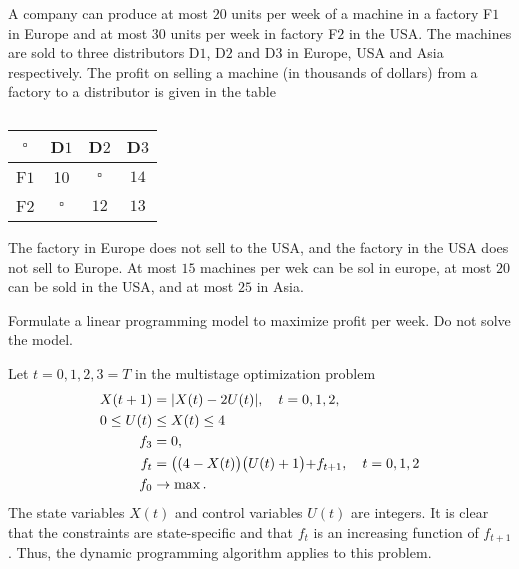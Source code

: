 A company can produce at most $20$ units per week of a machine in a factory F$1$ in Europe and at most $30$ units per week in factory F$2$ in the USA. The machines are sold to three distributors D$1$, D$2$ and D$3$ in Europe, USA and Asia respectively. The profit on selling a machine (in thousands of dollars) from a factory to a distributor is given in the table 
%
\begin{table}[H]
    \centering
    \caption{}
    \label{tab:my_label}
    \begin{tabular}{|c|c|c|c|} \hline 
         $\square$ &   D$1$    &    D$2$   & D$3$ \\ \hline 
              F$1$ &    10     & $\square$ & $14$ \\ \hline 
              F$2$ & $\square$ &    $12$   & $13$ \\ \hline 
    \end{tabular}
\end{table}
%
The factory in Europe does not sell to the USA, and the factory in the USA does not sell to Europe. At most $15$ machines per wek can be sol in europe, at most $20$ can be sold in the USA, and at most $25$ in Asia. 

Formulate a linear programming model to maximize profit per week. Do not solve the model.

\Problem

Let $t = 0,1,2,3=T$ in the multistage optimization problem
%
\begin{align*}
        X(t+1) 
    & = \lvert X(t) - 2U(t)\rvert, \quad t   
      = 0,1,2, \\
    0 \leq U(t) 
    & \leq X(t) \leq 4 \\
        f_3 
    & = 0, \\
        f_t 
    & = \bigl((4 - X(t)\bigl)\bigr(U(t) + 1\bigl) + f_{t+1}, \quad t = 0,1,2\\
    f_0 & \to \max.
\end{align*}
%
The state variables $X(t)$ and control variables $U(t)$ are integers. It is clear that the constraints are state-specific and that $f_t$ is an increasing function of $f_{t+1}$. Thus, the dynamic programming algorithm applies to this problem.

